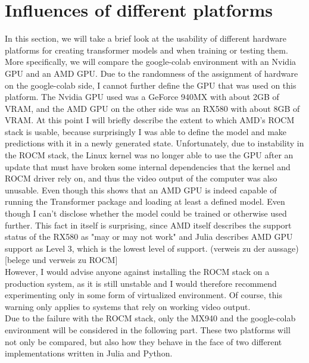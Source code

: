 \section{Influences of different platforms}
In this section, we will take a brief look at the usability of different hardware platforms for creating transformer models and when training or testing them. More specifically, we will compare the google-colab environment with an Nvidia GPU and an AMD GPU. Due to the randomness of the assignment of hardware on the google-colab side, I cannot further define the GPU that was used on this platform. The Nvidia GPU used was a GeForce 940MX with about 2GB of VRAM, and the AMD GPU on the other side was an RX580 with about 8GB of VRAM.
At this point I will briefly describe the extent to which AMD's ROCM stack is usable, because surprisingly I was able to define the model and make predictions with it in a newly generated state. Unfortunately, due to instability in the ROCM stack, the Linux kernel was no longer able to use the GPU after an update that must have broken some internal dependencies that the kernel and ROCM driver rely on, and thus the video output of the computer was also unusable. Even though this shows that an AMD GPU is indeed capable of running the Transformer package and loading at least a defined model. Even though I can't disclose whether the model could be trained or otherwise used further. This fact in itself is surprising, since AMD itself describes the support status of the RX580 as "may or may not work" and Julia describes AMD GPU support as Level 3, which is the lowest level of support. (verweis zu der aussage)[belege und verweis zu ROCM]\\
However, I would advise anyone against installing the ROCM stack on a production system, as it is still unstable and I would therefore recommend experimenting only in some form of virtualized environment. Of course, this warning only applies to systems that rely on working video output.\\
Due to the failure with the ROCM stack, only the MX940 and the google-colab environment will be considered in the following part. These two platforms will not only be compared, but also how they behave in the face of two different implementations written in Julia and Python.
